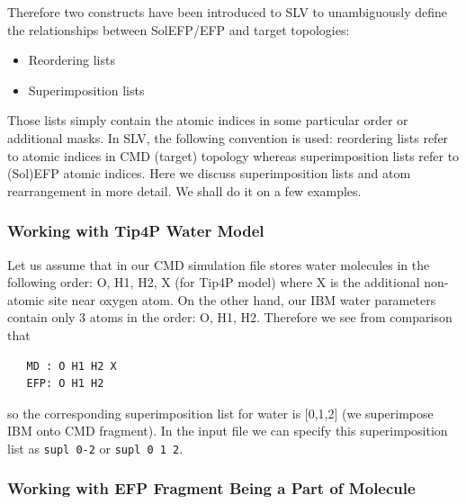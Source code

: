 \documentclass[b5paper,oneside,fleqn,11pt]{book}
\begin{document}
\begin{refsection}
Therefore two constructs have been introduced to SLV to unambiguously define the relationships
between SolEFP/EFP and target topologies:
%
\begin{itemize}
\item Reordering lists
\item Superimposition lists
\end{itemize}
%
Those lists simply contain the atomic indices in some particular order or additional masks. In SLV, the
following convention is used: reordering lists refer to atomic indices in CMD (target) topology whereas
superimposition lists refer to (Sol)EFP atomic indices.
Here we discuss superimposition lists and atom rearrangement
in more detail. We shall do it on a few examples.

\subsubsection{Working with Tip4P Water Model}

Let us assume that in our CMD simulation file stores water molecules in the following order: 
O, H1, H2, X (for Tip4P model) where X is the additional non\hyp{}atomic
site near oxygen atom. On the other hand, our IBM water parameters
contain only 3 atoms in the order: O, H1, H2. Therefore we see from comparison that
%
\begin{verbatim}
   MD : O H1 H2 X
   EFP: O H1 H2
\end{verbatim}
%
so the corresponding superimposition list for water is [0,1,2] (we superimpose IBM onto CMD
fragment). In the input file we can specify this superimposition
list as {\tt supl 0-2} or {\tt supl 0 1 2}.

\subsubsection{Working with EFP Fragment Being a Part of Molecule}


\end{refsection}
\end{document}

